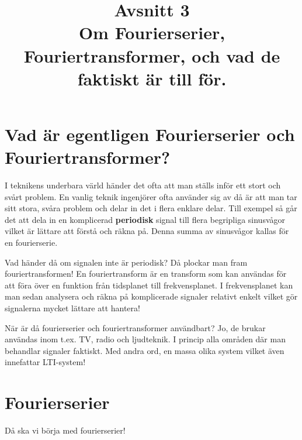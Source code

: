 \documentclass{article}
\title{Avsnitt 3 \\
\large Om Fourierserier, Fouriertransformer, och vad de faktiskt är till för.}
\author{ }
\date{}
\begin{document}
\maketitle

\section{Vad är egentligen Fourierserier och Fouriertransformer?}
I teknikens underbara värld händer det ofta att man ställs inför ett stort och svårt problem. En vanlig teknik ingenjörer ofta använder sig av då är att man tar sitt stora, svåra problem och delar in det i flera enklare delar. Till exempel så går det att dela in en komplicerad \textbf{periodisk} signal till flera begripliga sinusvågor vilket är lättare att förstå och räkna på. Denna summa av sinusvågor kallas för en fourierserie.

Vad händer då om signalen inte är periodisk? Då plockar man fram fouriertransformen! En fouriertransform är en transform som kan användas för att föra över en funktion från tidsplanet till frekvensplanet. I frekvensplanet kan man sedan analysera och räkna på komplicerade signaler relativt enkelt vilket gör signalerna mycket lättare att hantera!

När är då fourierserier och fouriertransformer användbart? Jo, de brukar användas inom t.ex. TV, radio och ljudteknik. I princip alla områden där man behandlar signaler faktiskt. Med andra ord, en massa olika system vilket även innefattar LTI-system!

\section{Fourierserier}

Då ska vi börja med fourierserier!
\end{document}
